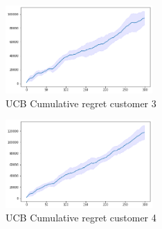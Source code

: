 \begin{multicols}{2}
    \begin{figure}[H]
        \begin{center}
        \includegraphics[width=0.5\textwidth]{img/ucb7_3cum_reg.png}
        \caption{UCB Cumulative regret customer 3}
        \label{fig:cum_reg73}
        \end{center}
    \end{figure}
    \columnbreak
    \begin{figure}[H]
        \begin{center}
        \includegraphics[width=0.5\textwidth]{img/ucb7_4cum_reg.png}
        \caption{UCB Cumulative regret customer 4}
        \label{fig:cum_reg74}
        \end{center}
    \end{figure}
\end{multicols}

